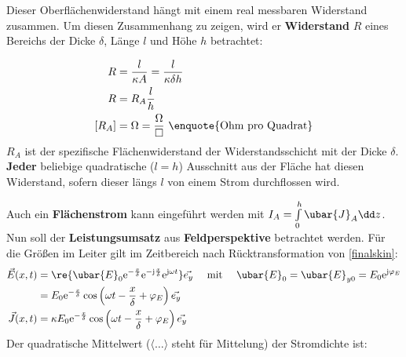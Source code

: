		  Dieser Oberflächenwiderstand hängt mit einem real messbaren Widerstand zusammen. Um diesen Zusammenhang zu zeigen, wird er \textbf{Widerstand} $R$ eines Bereichs der Dicke $\delta$, Länge $l$ und Höhe $h$ betrachtet:\\
		  \begin{minipage}{0.5\textwidth}
		  	\centering
\resizebox{.7\textwidth}{!}{}
		  \end{minipage}
		  \begin{minipage}{0.5\textwidth}
		  	\begin{equation*}\begin{split}
		  		R &= \frac{l}{\kappa A} = \frac{l}{\kappa \delta h}\\
		  		R &= R_A \frac{l}{h} \\
		  		[R_A] &= \Omega = \frac{\Omega}{\Box} \text{ \enquote{Ohm pro Quadrat}}
		  		\end{split}\end{equation*}
	  		$R_A$ ist der spezifische Flächenwiderstand der Widerstandsschicht mit der Dicke $\delta$. \textbf{Jeder} beliebige quadratische ($l=h$) Ausschnitt aus der Fläche hat diesen Widerstand, sofern dieser längs $l$ von einem Strom durchflossen wird.
		  \end{minipage}
		   Auch ein \textbf{Flächenstrom} kann eingeführt werden mit $I_A=\int\limits_0^h \ubar{J}_A  \dd z $.\\
		   Nun soll der \textbf{Leistungsumsatz} aus \textbf{Feldperspektive} betrachtet werden. Für die Größen im Leiter gilt im Zeitbereich nach Rücktransformation von \ref{finalskin}:
			        \begin{equation}\begin{split}
					        \vec{E}(x,t) &= \re{  \ubar{E}_{0}  \mathrm{e}^{-\frac{x}{\delta}}  \mathrm{e}^{-\mathrm{j}\frac{x}{\delta}}  \mathrm{e}^{\mathrm{j}\omega t}} \vec{e_y}   \quad\text{ mit }\quad \ubar{E}_{0}=\ubar{E}_{y0} = E_{0}  \mathrm{e}^{\mathrm{j}\varphi_E} \\
					        &= E_0  \mathrm{e}^{-\frac{x}{\delta}} \cos\left(\omega t -\frac{x}{\delta} +\varphi_E \right) \vec{e_y} \\
					        \vec{J}(x,t) &= \kappa E_0  \mathrm{e}^{-\frac{x}{\delta}} \cos\left(\omega t -\frac{x}{\delta} +\varphi_E \right) \vec{e_y}
				        \end{split}\end{equation}
			   Der quadratische Mittelwert ($\langle \dots\rangle$ steht für Mittelung) der Stromdichte ist:
